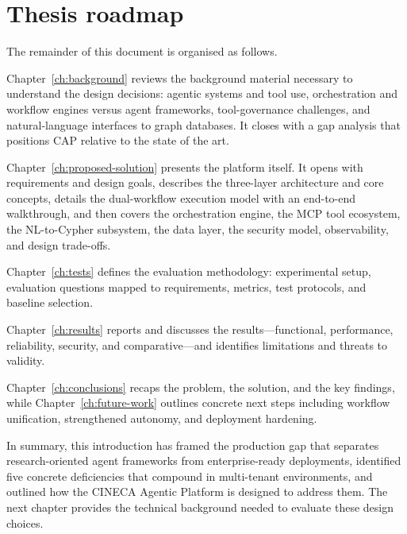 \documentclass[a4paper,noexaminfo]{sapthesis}
\begin{document}
\section{Thesis roadmap}
\label{sec:thesis-roadmap}

The remainder of this document is organised as follows.

Chapter~\ref{ch:background} reviews the background material necessary to
understand the design decisions: agentic systems and tool use, orchestration
and workflow engines versus agent frameworks, tool-governance challenges,
and natural-language interfaces to graph databases.  It closes with a gap
analysis that positions CAP relative to the state of the art.

Chapter~\ref{ch:proposed-solution} presents the platform itself.  It opens
with requirements and design goals, describes the three-layer architecture
and core concepts, details the dual-workflow execution model with an
end-to-end walkthrough, and then covers the orchestration engine, the MCP
tool ecosystem, the NL-to-Cypher subsystem, the data layer, the security
model, observability, and design trade-offs.

Chapter~\ref{ch:tests} defines the evaluation methodology: experimental
setup, evaluation questions mapped to requirements, metrics, test protocols,
and baseline selection.

Chapter~\ref{ch:results} reports and discusses the results---functional,
performance, reliability, security, and comparative---and identifies
limitations and threats to validity.

Chapter~\ref{ch:conclusions} recaps the problem, the solution, and the
key findings, while Chapter~\ref{ch:future-work} outlines concrete next
steps including workflow unification, strengthened autonomy, and
deployment hardening.

\medskip
\noindent
In summary, this introduction has framed the production gap that separates
research-oriented agent frameworks from enterprise-ready deployments,
identified five concrete deficiencies that compound in multi-tenant
environments, and outlined how the CINECA Agentic Platform is designed to
address them.  The next chapter provides the technical background needed to
evaluate these design choices.

\end{document}
